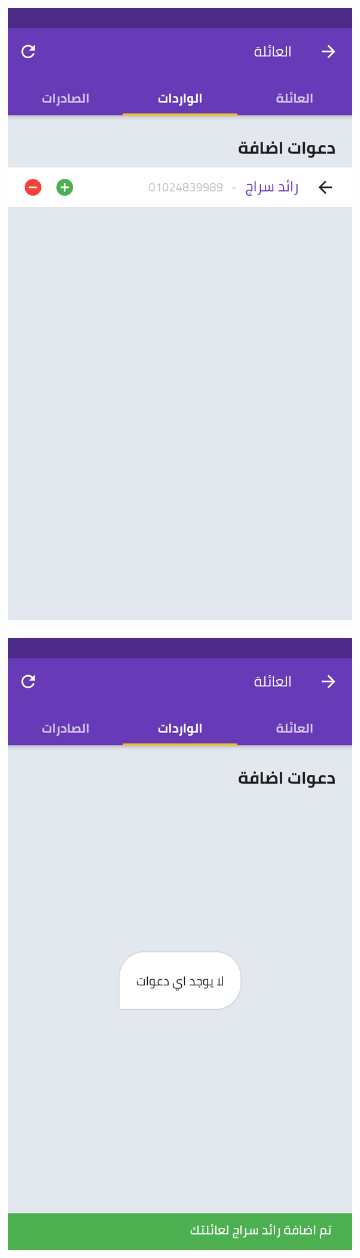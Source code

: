 \begin{figure}[H] 
  
  \begin{subfigure}[b]{0.5\linewidth}
    \centering
    \includegraphics[width=0.5\linewidth]{images/ch3/family/2.png}
  
    \label{fig7:c} 
  \end{subfigure}%
    \begin{subfigure}[b]{0.5\linewidth}
    \centering
    \includegraphics[width=0.5\linewidth]{images/ch3/family/3.png}
  

\end{subfigure}
\end{figure}
